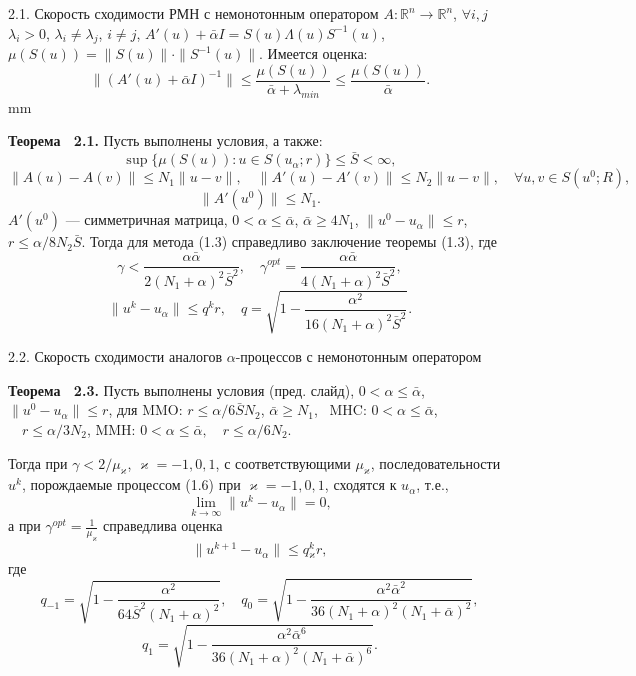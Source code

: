 \documentclass[10pt,pdf, mathserif, hyperref={unicode}]{beamer}
\begin{document}
\begin{frame}{\small 2.1. Скорость сходимости РМН с немонотонным оператором}
$A\colon \mathbb{R}^n\to \mathbb{R}^n$, $\forall i,j$ $\lambda _i>0$, $\lambda _i\neq\lambda_j$, $i\neq j$, $A'(u)+\bar\alpha I =S(u)\Lambda(u) S^{-1}(u)$, $\mu(S(u))=\|S(u)\|\cdot\|S^{-1}(u)\|.$
Имеется оценка:
	$$\|(A'(u)+\bar\alpha I)^{-1}\|\leqslant \frac{\mu (S(u))}{\bar\alpha+\lambda_{min}} \leqslant \frac{\mu(S(u))}{\bar\alpha}.$$
	 mm
	\begin{block}{\bf Теорема ~2.1.}
		Пусть выполнены условия, а также: \quad $$\sup\{\mu(S(u)): u\in S(u_\alpha;r)\}\leqslant\bar S <\infty,$$ 
		$$\|A(u)-A(v)\|\leqslant N_1\|u-v\|,\quad
		\|A'(u)-A'(v)\|\leqslant N_2\|u-v\|, \quad \forall u, v \in S(u^0;R),$$
		$$\|A'(u^0)\| \leqslant N_1.$$
		$A'(u^0)$ --- симметричная матрица, $0<\alpha\leqslant\bar\alpha$, $\bar\alpha\geqslant 4N_1$, $\|u^0-u_\alpha\| \leqslant r$, $r\leqslant\alpha/8N_2\bar S$. Тогда для метода (1.3) справедливо заключение теоремы (1.3), где
		$$\gamma<\frac{\alpha\bar\alpha}{2(N_1+\alpha)^2\bar S^2},
		\quad
		{\gamma}^{opt}=\frac{\alpha\bar\alpha}{4(N_1+\alpha)^2\bar S^2},$$ 
		$$\|u^k-u_\alpha\|\leqslant q^k r, \quad q=\sqrt{1-\frac{\alpha ^2}{16(N_1+\alpha)^2\bar S^2}}.$$
	\end{block}
\end{frame}

\begin{frame}{\small 2.2. Скорость сходимости аналогов $\alpha$-процессов с немонотонным оператором}
	\begin{block}{\bf Теорема ~2.3.}
		Пусть выполнены условия (пред. слайд), $0<\alpha\leqslant\bar\alpha$, $\|u^0-u_\alpha\| \leqslant r$, для MMO: $r\leqslant\alpha /6\bar SN_2$, $\bar\alpha \geqslant N_1$, \ MHC: $0<\alpha\leqslant\bar\alpha$, $\quad r\leqslant\alpha /3N_2$,
		MMH: $0<\alpha\leqslant\bar\alpha, \quad r\leqslant\alpha /6N_2$. 
		
		Тогда при $\gamma<2/\mu _\varkappa$, $\varkappa=-1,0,1$, с соответствующими $\mu _\varkappa$, последовательности ${u^k}$, порождаемые процессом (1.6) при $\varkappa=-1,0,1$, сходятся к $u_\alpha$, т.е., $$\lim_{k\to\infty}\|u^k-u_\alpha\|=0,$$ а при $
		\gamma^{opt}=\frac{1}{\mu_\varkappa}$
		справедлива оценка $$\|u^{k+1}-u_\alpha\|\leqslant q{_\varkappa^k}r,$$ где
		$$q_{-1}=\sqrt{1-\frac{\alpha^2}{64\bar S^2(N_1+\alpha)^2}}, \quad q_0=\sqrt{1-\frac{\alpha^2\bar\alpha^2}{36(N_1+\alpha)^2(N_1+\bar\alpha)^2}},$$
		$$q_1=\sqrt{1-\frac{\alpha^2\bar\alpha^6}{36(N_1+\alpha)^2(N_1+\bar\alpha)^6}}.$$
	\end{block}
\end{frame}
\end{document}

